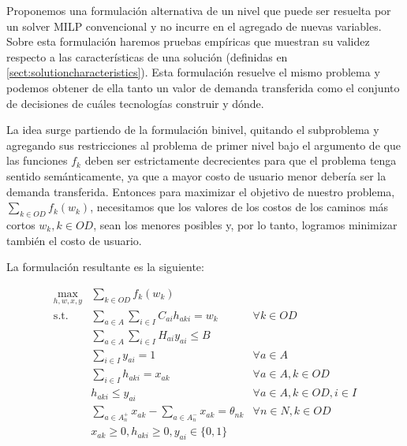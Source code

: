 Proponemos una formulación alternativa de un nivel que puede ser resuelta por un solver MILP convencional y no incurre en el agregado de nuevas variables. Sobre esta formulación haremos pruebas empíricas que muestran su validez respecto a las características de una solución (definidas en \ref{sect:solutioncharacteristics}). Esta formulación resuelve el mismo problema y podemos obtener de ella tanto un valor de demanda transferida como el conjunto de decisiones de cuáles tecnologías construir y dónde.

La idea surge partiendo de la formulación binivel, quitando el subproblema y agregando sus restricciones al problema de primer nivel bajo el argumento de que las funciones $f_k$ deben ser estrictamente decrecientes para que el problema tenga sentido semánticamente, ya que a mayor costo de usuario menor debería ser la demanda transferida. Entonces para maximizar el objetivo de nuestro problema, $\sum_{k \in OD}f_k(w_k)$, necesitamos que los valores de los costos de los caminos más cortos $w_k, k \in OD$, sean los menores posibles y, por lo tanto, logramos minimizar también el costo de usuario.

La formulación resultante es la siguiente:

\begin{align}
  \max_{h,w,x,y}          & \sum_{k \in OD} f_k(w_k)                                    & \label{eq:objectivealt} \\
  \text{s.t.}\; & \sum_{a \in A} \sum_{i \in I} C_{ai}h_{aki} = w_k           & \forall k \in OD \label{eq:shortestpathalt} \\
                & \sum_{a \in A} \sum_{i \in I} H_{ai}y_{ai} \leq B           & \label{eq:respectbudgetalt} \\
                & \sum_{i \in I} y_{ai} = 1                                   & \forall a \in A \label{eq:alwaysoneyalt} \\
                & \sum_{i \in I} h_{aki} = x_{ak}                             & \forall a \in A, k \in OD \\
                & h_{aki} \leq y_{ai}                                         & \forall a \in A, k \in OD, i \in I \\
                & \sum_{a \in A_n^+} x_{ak} - \sum_{a \in A_n^-} x_{ak} = \theta_{nk}   & \forall n \in N, k \in OD \label{eq:flowbalancealt} \\
                & x_{ak} \geq 0, h_{aki} \geq 0, y_{ai} \in \{0,1\}                     & \nonumber
\end{align}


